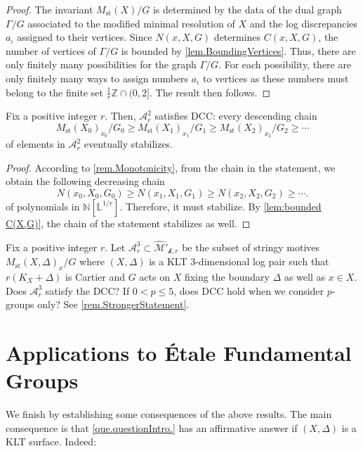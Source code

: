 \documentclass[12pt]{amsart}
\theoremstyle{plain}   %
\theoremstyle{definition}    %
\theoremstyle{remark}    %
\numberwithin{equation}{theorem}
\DeclareMathOperator{\st}{\mathrm{st}}
\newcommand{\kay}{\mathcal{k}}
\newcommand{\sA}{\mathcal{A}}
\newcommand{\sM}{\mathcal{M}}
\newcommand{\bL}{\mathbb{L}}
\newcommand{\bN}{\mathbb{N}}
\newcommand{\bZ}{\mathbb{Z}}
\begin{document}
\begin{proof}
The invariant $M_{\st}(X)/G$ is determined by the data of the dual graph $\Gamma/G$ associated to the modified minimal resolution of $X$ and the log discrepancies $a_{\iota}$ assigned to their vertices. Since $N(x,X,G)$
determines $C(x,X,G)$, the number of vertices of $\Gamma/G$ is bounded by \autoref{lem.BoundingVertices}. Thus, there are only finitely many possibilities for the graph $\Gamma/G$. For each possibility, there are only finitely many ways to assign numbers $a_{\iota}$ to vertices as these numbers must belong to the finite set $\frac{1}{r}\bZ\cap(0,2]$. The result then follows.
\end{proof}

\begin{proposition} 
\label{prop:DCC} Fix a positive integer $r$. Then, $\sA_r^2$ satisfies DCC: every descending chain
\[
M_{\st}(X_{0})_{x_0}/G_{0}\ge M_{\st}(X_{1})_{x_1}/G_{1}\ge M_{\st}(X_{2})_{x_2}/G_{2} \ge \cdots
\]
of elements in $\sA_r^2$ eventually stabilizes. 
\end{proposition}

\begin{proof}According to \autoref{rem.Monotonicity}, from the chain in the statement, we obtain the following decreasing chain
\[
N(x_0, X_0, G_0) \geq N(x_1,X_1,G_1) \geq N(x_2,X_2,G_2) \geq \cdots.
\]
of polynomials in $\bN[\bL^{1/r}]$. Therefore, it must stabilize. By \autoref{lem:bounded C(X,G)}, the chain of the statement stabilizes as well.
\end{proof}

\begin{question} \label{que.DCCForThreefolds}
Fix a positive integer $r$. Let $\sA_r^3 \subset \hat{\sM}'_{\kay,r}$ be the subset of stringy motives $M_{\st}(X,\Delta)_x/G$ where $(X,\Delta)$ is a KLT $3$-dimensional log pair such that $r(K_X + \Delta)$ is Cartier and $G$ acts on $X$ fixing the boundary $\Delta$ as well as $x \in X$. Does $\sA_r^3$ satisfy the DCC? If $0<p \leq 5$, does DCC hold when we consider $p$-groups only? See \autoref{rem.StrongerStatement}. 
\end{question}

\section{Applications to \'Etale Fundamental Groups}

We finish by establishing some consequences of the above results. The main consequence is that \autoref{que.questionIntro.} has an affirmative answer if $(X,\Delta)$ is a KLT surface. Indeed:
\end{document}
